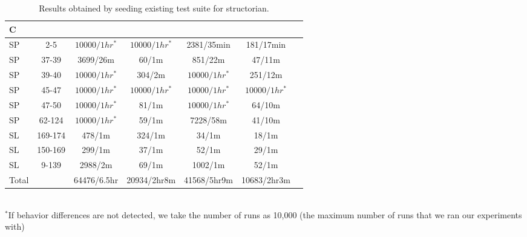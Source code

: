 \begin{table}
\begin{CodeOut}
\begin{center}
\begin{tiny}
\vspace{-0.7cm}
\caption {\label{table:rq5}\scriptsize{Results obtained by seeding existing test suite for structorian.}}
\vspace{-0.3cm}
\begin {tabular} {|l|c|c|c|c|c|c|}
\hline
C & \CenterCell{V} &\CenterCell{$N_{Pex}/T$}&\CenterCell{$Np_{seed}/T$} &\CenterCell{$N_{eXpress}/T$} &\CenterCell{$Ne_{seed}$/T}\\

\hline
SP&2-5&$10000/1hr^*$&$10000/1hr^*$&2381/35min&181/17min\\
\hline
SP&37-39		&3699/26m			&60/1m			&851/22m				&47/11m\\
\hline
SP&39-40		&$10000/1hr^*$	&304/2m			&$10000/1hr^*$		&251/12m\\
\hline
SP&45-47&		$10000/1hr^*$		&$10000/1hr^*$&$10000/1hr^*$		&$10000/1hr^*$\\
\hline
SP&47-50&		$10000/1hr^*$		&81/1m			&$10000/1hr^*$		&64/10m\\
\hline
SP&62-124&	$10000/1hr^*$		&59/1m			&7228/58m				&41/10m\\
\hline
SL&169-174	&478/1m				&324/1m			&34/1m					&18/1m\\
\hline
SL&150-169	&299/1m				&37/1m			&52/1m					&29/1m\\
\hline
SL&9-139		&2988/2m			&69/1m			&1002/1m				&52/1m\\
\hline
Total&			&64476/6.5hr		&20934/2hr8m				&41568/5hr9m					&10683/2hr3m\\
\hline
\end{tabular}\\
$^*$\scriptsize{If behavior differences are not detected, we take the number of runs as 10,000 (the maximum number of runs that we ran our experiments with)} 
\end{tiny}
\end{center}
\end{CodeOut}
\vspace{- 0.4 in}
\end{table}


